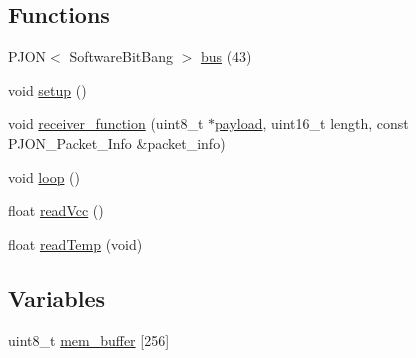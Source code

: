 \subsection*{Functions}
\begin{DoxyCompactItemize}
\item 
P\-J\-O\-N$<$ Software\-Bit\-Bang $>$ \hyperlink{OWP__DG__Dragino__Sensors_8ino_acccd0988c10360254d763b73e83cd1de}{bus} (43)
\item 
void \hyperlink{OWP__DG__Dragino__Sensors_8ino_a4fc01d736fe50cf5b977f755b675f11d}{setup} ()
\item 
void \hyperlink{OWP__DG__Dragino__Sensors_8ino_a76fc5e73c141f748dcc1809fdcfa1714}{receiver\-\_\-function} (uint8\-\_\-t $\ast$\hyperlink{Uno__Dragino__LoRa__GPS__Shield__TTN_8ino_a78a402d1762842473567de90b11ed256}{payload}, uint16\-\_\-t length, const P\-J\-O\-N\-\_\-\-Packet\-\_\-\-Info \&packet\-\_\-info)
\item 
void \hyperlink{OWP__DG__Dragino__Sensors_8ino_afe461d27b9c48d5921c00d521181f12f}{loop} ()
\item 
float \hyperlink{OWP__DG__Dragino__Sensors_8ino_a0b3195c3893f02cb1b80d878b89549d6}{read\-Vcc} ()
\item 
float \hyperlink{OWP__DG__Dragino__Sensors_8ino_ada109bb0cdc12131465dfe7a74f93b1e}{read\-Temp} (void)
\end{DoxyCompactItemize}
\subsection*{Variables}
\begin{DoxyCompactItemize}
\item 
uint8\-\_\-t \hyperlink{OWP__DG__Dragino__Sensors_8ino_a02235b4e96743403348a58d554caa3dc}{mem\-\_\-buffer} \mbox{[}256\mbox{]}
\end{DoxyCompactItemize}


